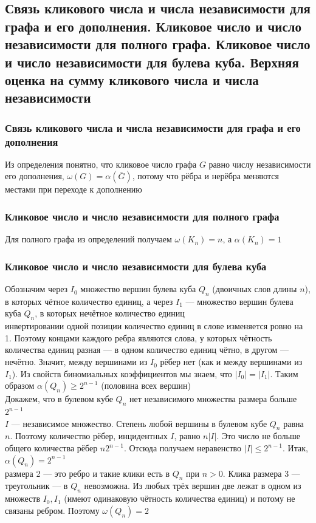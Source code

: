 \documentclass[a4paper]{article}
\begin{document}
\subsection{Связь кликового числа и числа независимости для графа и его дополнения. Кликовое число и число независимости для полного графа. Кликовое число и число независимости для булева куба. Верхняя оценка на сумму кликового числа и числа независимости}
\subsubsection*{Связь кликового числа и числа независимости для графа и его дополнения}
Из определения понятно, что кликовое число графа $G$ равно числу независимости его дополнения, $\omega(G) = \alpha(\bar G)$, потому что рёбра и нерёбра меняются местами при переходе к дополнению
\subsubsection*{Кликовое число и число независимости для полного графа}
Для полного графа из определений получаем $\omega(K_n) = n$, а $\alpha(K_n) = 1$
\subsubsection*{Кликовое число и число независимости для булева куба}
Обозначим через $I_0$ множество вершин булева куба $Q_n$ (двоичных слов длины $n$), в которых чётное количество единиц, а через $I_1$ — множество вершин булева куба $Q_n$, в которых нечётное количество единиц\\[2mm]
 инвертировании одной позиции количество единиц в слове изменяется ровно на 1. Поэтому концами каждого ребра являются слова, у которых чётность количества единиц разная — в одном количество единиц чётно, в другом — нечётно. Значит, между вершинами из $I_0$ рёбер нет (как и между вершинами из $I_1$). Из свойств биномиальных коэффициентов мы знаем, что $\left|I_0\right|=\left|I_1\right|$. Таким образом $\alpha\left(Q_n\right) \geqslant 2^{n-1}$ (половина всех вершин)\\[2mm]
\indent Докажем, что в булевом кубе $Q_n$ нет независимого множества размера больше $2^{n-1}$\\[2mm]
 $I$ — независимое множество. Степень любой вершины в булевом кубе $Q_n$ равна $n$. Поэтому количество рёбер, инцидентных $I$, равно $n|I|$. Это число не больше общего количества рёбер $n 2^{n-1}$. Отсюда получаем неравенство $|I| \leqslant 2^{n-1}$. Итак, $\alpha\left(Q_n\right)=2^{n-1}$\\[2mm]
 размера 2 — это ребро и такие клики есть в $Q_n$ при $n>0$. Клика размера 3 — треугольник — в $Q_n$ невозможна. Из любых трёх вершин две лежат в одном из множеств $I_0, I_1$ (имеют одинаковую чётность количества единиц) и потому не связаны ребром. Поэтому $\omega\left(Q_n\right)=2$
\end{document}
